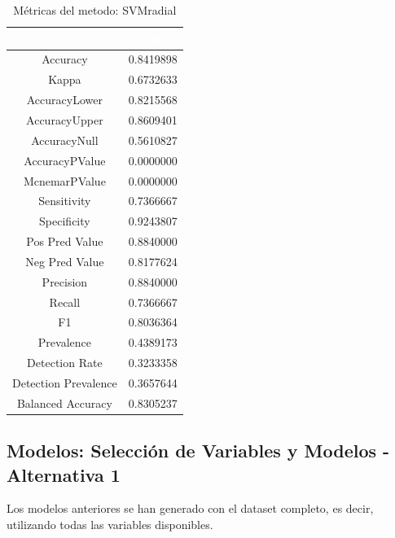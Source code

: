\begin{table}[!h]
	
	\caption{\label{tab:metricas_SVMradial}Métricas del metodo: SVMradial }
	\centering
	\begin{tabular}[t]{cc}
		\toprule
		\rowcolor{black}  \multicolumn{1}{c}{\textcolor{white}{\textbf{metricas}}} & \multicolumn{1}{c}{\textcolor{white}{\textbf{valor}}}\\
		\midrule
		\rowcolor{gray!6}  Accuracy & 0.8419898\\
		Kappa & 0.6732633\\
		\rowcolor{gray!6}  AccuracyLower & 0.8215568\\
		AccuracyUpper & 0.8609401\\
		\rowcolor{gray!6}  AccuracyNull & 0.5610827\\
		\addlinespace
		AccuracyPValue & 0.0000000\\
		\rowcolor{gray!6}  McnemarPValue & 0.0000000\\
		Sensitivity & 0.7366667\\
		\rowcolor{gray!6}  Specificity & 0.9243807\\
		Pos Pred Value & 0.8840000\\
		\addlinespace
		\rowcolor{gray!6}  Neg Pred Value & 0.8177624\\
		Precision & 0.8840000\\
		\rowcolor{gray!6}  Recall & 0.7366667\\
		F1 & 0.8036364\\
		\rowcolor{gray!6}  Prevalence & 0.4389173\\
		\addlinespace
		Detection Rate & 0.3233358\\
		\rowcolor{gray!6}  Detection Prevalence & 0.3657644\\
		Balanced Accuracy & 0.8305237\\
		\bottomrule
	\end{tabular}
\end{table}


\clearpage

\subsection{Modelos: Selección de Variables y Modelos - Alternativa 1}

Los modelos anteriores se han generado con el dataset completo, es decir, utilizando todas las variables disponibles.\\

